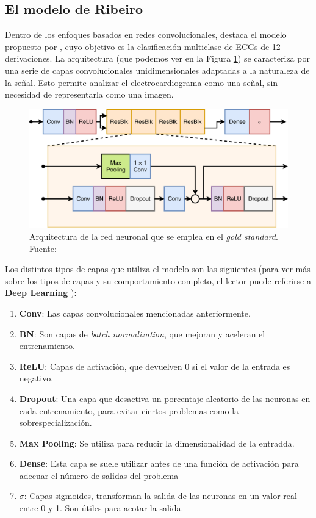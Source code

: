 \subsection{El modelo de Ribeiro}
Dentro de los enfoques basados en redes convolucionales, destaca el modelo propuesto por \cite{ribeiro}, cuyo objetivo es la clasificación multiclase de ECGs de 12 derivaciones. La arquitectura (que podemos ver en la Figura \ref{fig:ribeiro_arch}) se caracteriza por una serie de capas convolucionales unidimensionales adaptadas a la naturaleza de la señal. Esto permite analizar el electrocardiograma como una señal, sin necesidad de representarla como una imagen.

\begin{figure}[t]
	\centering
	\includegraphics[width=\textwidth]{Imagenes/Vectorial/ribeiro_arch.png}
	\caption{Arquitectura de la red neuronal que se emplea en el \emph{gold standard}. Fuente: \cite{ribeiro}}
	\label{fig:ribeiro_arch}
\end{figure}

Los distintos tipos de capas que utiliza el modelo son las siguientes (para ver más sobre los tipos de capas y su comportamiento completo, el lector puede referirse a \textbf{Deep Learning} \cite{Goodfellow-et-al-2016}):

\begin{enumerate}
	\item \textbf{Conv}: Las capas convolucionales mencionadas anteriormente.
	\item  \textbf{BN}: Son capas de \emph{batch normalization}, que mejoran y aceleran el entrenamiento.
	\item \textbf{ReLU}: Capas de activación, que devuelven 0 si el valor de la entrada es negativo.
	\item \textbf{Dropout}: Una capa que desactiva un porcentaje aleatorio de las neuronas en cada entrenamiento, para evitar ciertos problemas como la sobrespecialización.
	\item \textbf{Max Pooling}: Se utiliza para reducir la dimensionalidad de la entradda.
	\item \textbf{Dense}: Esta capa se suele utilizar antes de una función de activación para adecuar el número de salidas del problema
	\item \textbf{$\sigma$}: Capas sigmoides, transforman la salida de las neuronas en un valor real entre 0 y 1. Son útiles para acotar la salida.
\end{enumerate}

